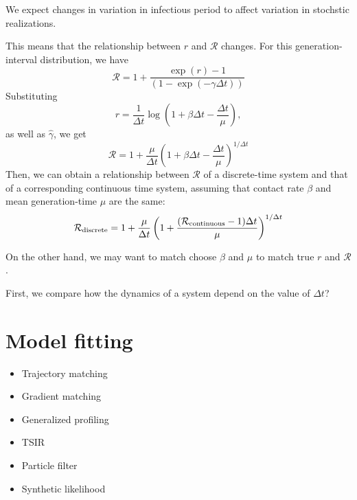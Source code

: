 \documentclass{article}
\begin{document}
We expect changes in variation in infectious period to affect variation in stochstic realizations.

This means that the relationship between $r$ and $\mathcal R$ changes.
For this generation-interval distribution, we have
\begin{equation}
\mathcal R = 1 + \frac{\exp(r) -1}{(1-\exp(-\gamma \Delta t)) }
\end{equation}
Substituting 
\begin{equation}
r = \frac{1}{\Delta t} \log \left(1 + \beta \Delta t - \frac{\Delta t}{\mu}\right),
\end{equation}
as well as $\hat \gamma$, we get
\begin{equation}
\mathcal R = 1 + \frac{\mu}{\Delta t} \left(1 + \beta \Delta t - \frac{\Delta t}{\mu}\right)^{1/\Delta t}
\end{equation}
Then, we can obtain a relationship between $\mathcal R$ of a discrete-time system and that of a corresponding continuous time system, assuming that contact rate $\beta$ and mean generation-time $\mu$ are the same:
\begin{equation}
\mathcal R_{\tiny \textrm{discrete}} = 1 + \frac{\mu}{\Delta t} \left(1 + \frac{(\mathcal R_{\tiny \textrm{continuous}}  - 1) \Delta t }{\mu}\right)^{1/\Delta t}
\end{equation}

On the other hand, we may want to match choose $\beta$ and $\mu$ to match true $r$ and $\mathcal R$.




First, we compare how the dynamics of a system depend on the value of $\Delta t$?



\section{Model fitting}

\begin{itemize}
	\item Trajectory matching
	\item Gradient matching
	\item Generalized profiling
	\item TSIR
	\item Particle filter
	\item Synthetic likelihood
\end{itemize}
\end{document}
